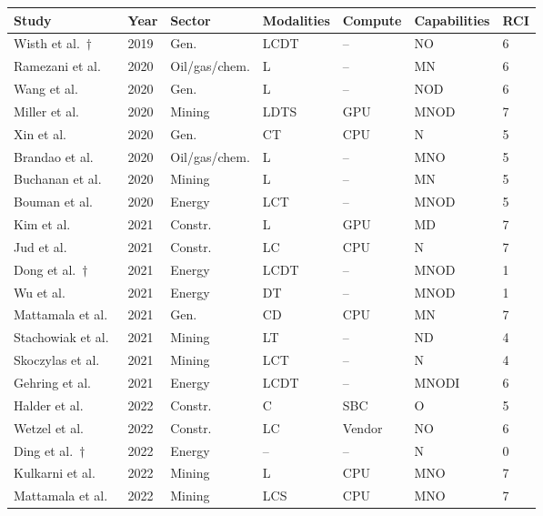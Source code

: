 \begin{longtable}{lllllll}
\toprule
\textbf{Study} & \textbf{Year} & \textbf{Sector} & \textbf{Modalities} & \textbf{Compute} & \textbf{Capabilities} & \textbf{RCI}\\
\midrule
\endhead
\bottomrule
\endfoot
Wisth et al.~\cite{inc:paper014}$\dagger$ & 2019 & Gen. & LCDT & -- & NO & 6\\
Ramezani et al.~\cite{inc:paper019} & 2020 & Oil/gas/chem. & L & -- & MN & 6\\
Wang et al.~\cite{inc:paper040} & 2020 & Gen. & L & -- & NOD & 6\\
Miller et al.~\cite{inc:paper005} & 2020 & Mining & LDTS & GPU & MNOD & 7\\
Xin et al.~\cite{inc:paper007} & 2020 & Gen. & CT & CPU & N & 5\\
Brandao et al.~\cite{inc:paper073} & 2020 & Oil/gas/chem. & L & -- & MNO & 5\\
Buchanan et al.~\cite{inc:r2-0477} & 2020 & Mining & L & -- & MN & 5\\
Bouman et al.~\cite{inc:r2-0192} & 2020 & Energy & LCT & -- & MNOD & 5\\
Kim et al.~\cite{inc:paper065} & 2021 & Constr. & L & GPU & MD & 7\\
Jud et al.~\cite{inc:paper087} & 2021 & Constr. & LC & CPU & N & 7\\
Dong et al.~\cite{inc:paper075}$\dagger$ & 2021 & Energy & LCDT & -- & MNOD & 1\\
Wu et al.~\cite{inc:paper036} & 2021 & Energy & DT & -- & MNOD & 1\\
Mattamala et al.~\cite{inc:paper038} & 2021 & Gen. & CD & CPU & MN & 7\\
Stachowiak et al.~\cite{inc:paper078} & 2021 & Mining & LT & -- & ND & 4\\
Skoczylas et al.~\cite{inc:paper085} & 2021 & Mining & LCT & -- & N & 4\\
Gehring et al.~\cite{inc:r2-1437} & 2021 & Energy & LCDT & -- & MNODI & 6\\
Halder et al.~\cite{inc:paper069} & 2022 & Constr. & C & SBC & O & 5\\
Wetzel et al.~\cite{inc:paper070} & 2022 & Constr. & LC & Vendor & NO & 6\\
Ding et al.~\cite{inc:paper018}$\dagger$ & 2022 & Energy & -- & -- & N & 0\\
Kulkarni et al.~\cite{inc:paper013} & 2022 & Mining & L & CPU & MNO & 7\\
Mattamala et al.~\cite{inc:paper025} & 2022 & Mining & LCS & CPU & MNO & 7\\

\end{longtable}
